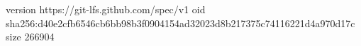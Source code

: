 version https://git-lfs.github.com/spec/v1
oid sha256:d40e2cfb6546cb6bb98b3f0904154ad32023d8b217375c74116221d4a970d17c
size 266904
